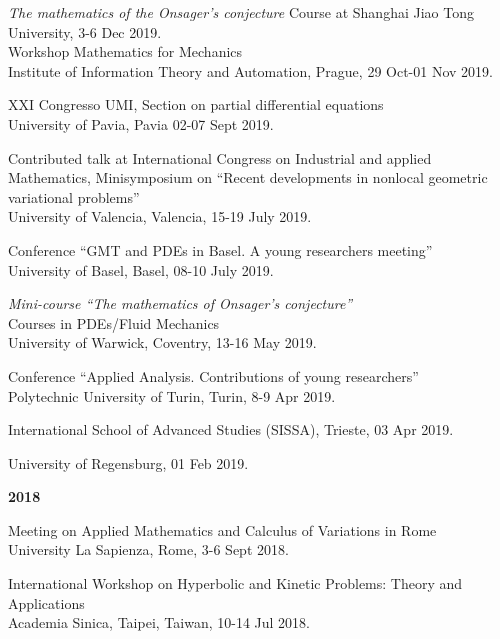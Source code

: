 \documentclass[10pt]{article}
\newcommand{\blankline}{\quad\pagebreak[2]}
\begin{document}
\emph{The mathematics of the Onsager's conjecture}
Course at Shanghai Jiao Tong University, 3-6 Dec 2019.\\

Workshop Mathematics for Mechanics\\
Institute of Information Theory and Automation, Prague, 29 Oct-01 Nov 2019.\\
\blankline

XXI Congresso UMI, Section on partial differential equations\\
University of Pavia, Pavia 02-07 Sept 2019.\\
\blankline 

Contributed talk at International Congress on Industrial and applied Mathematics, Minisymposium on ``Recent developments in nonlocal geometric variational problems''\\
University of Valencia, Valencia, 15-19 July 2019.\\
\blankline


Conference ``GMT and PDEs in Basel. A young researchers meeting''\\
University of Basel, Basel, 08-10 July 2019.\\
\blankline

\emph{Mini-course  ``The mathematics of Onsager's conjecture''}\\
Courses in PDEs/Fluid Mechanics\\
University of Warwick, Coventry, 13-16 May 2019.\\
\blankline

Conference ``Applied Analysis. Contributions of young researchers''\\
Polytechnic University of Turin, Turin, 8-9 Apr 2019.\\
\blankline


International School of Advanced Studies (SISSA), Trieste, 03 Apr 2019.\\
\blankline 


University of Regensburg, 01 Feb 2019.\\
\blankline


\textbf{2018}\\
\blankline


Meeting on Applied Mathematics and Calculus of Variations in Rome\\
University La Sapienza, Rome, 3-6 Sept 2018.\\
\blankline


International Workshop on Hyperbolic and Kinetic Problems: Theory and Applications\\
Academia Sinica, Taipei, Taiwan, 10-14 Jul 2018.\\
\blankline
\end{document}
